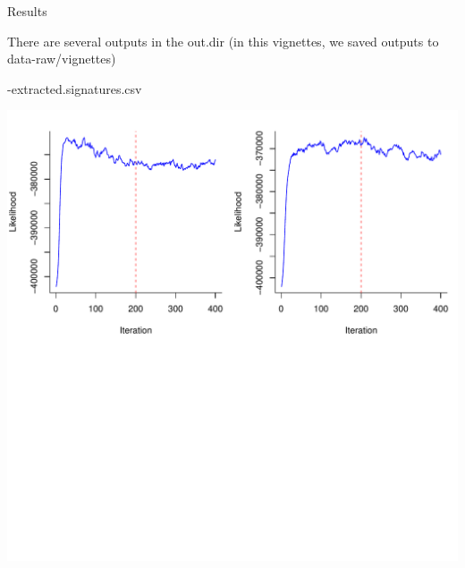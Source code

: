 \documentclass[
]{article}
\begin{document}
Results

There are several outputs in the out.dir (in this vignettes, we saved
outputs to data-raw/vignettes)

-extracted.signatures.csv

\includegraphics{vignettes/Diagnostic_Plots/diagnostics.likelihood.pdf}
\end{document}

